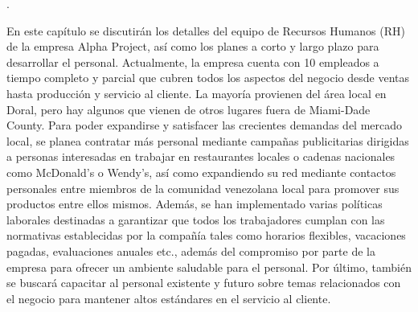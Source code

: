 .

En este capítulo se discutirán los detalles del equipo de Recursos Humanos (RH) de la empresa Alpha Project, así como los planes a corto y largo plazo para desarrollar el personal. Actualmente, la empresa cuenta con 10 empleados a tiempo completo y parcial que cubren todos los aspectos del negocio desde ventas hasta producción y servicio al cliente. La mayoría provienen del área local en Doral, pero hay algunos que vienen de otros lugares fuera de Miami-Dade County. Para poder expandirse y satisfacer las crecientes demandas del mercado local, se planea contratar más personal mediante campañas publicitarias dirigidas a personas interesadas en trabajar en restaurantes locales o cadenas nacionales como McDonald's o Wendy's, así como expandiendo su red mediante contactos personales entre miembros de la comunidad venezolana local para promover sus productos entre ellos mismos.  Además, se han implementado varias políticas laborales destinadas a garantizar que todos los trabajadores cumplan con las normativas establecidas por la compañía tales como horarios flexibles, vacaciones pagadas, evaluaciones anuales etc., además del compromiso por parte de la empresa para ofrecer un ambiente saludable para el personal. Por último, también se buscará capacitar al personal existente y futuro sobre temas relacionados con el negocio para mantener altos estándares en el servicio al cliente.